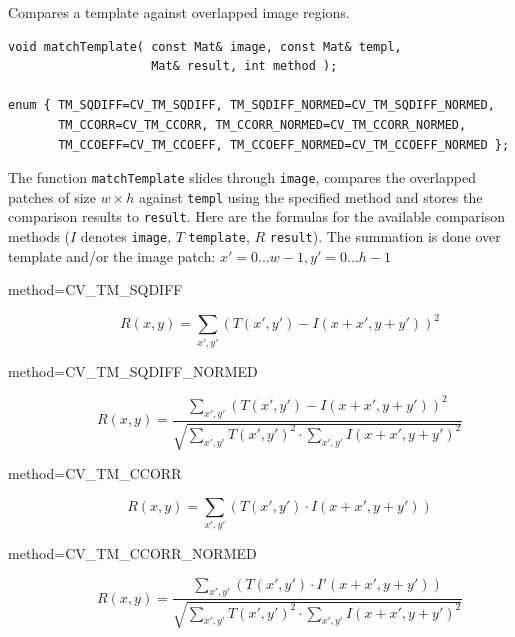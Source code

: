 \begin{description}
\label{matchTemplate}
Compares a template against overlapped image regions.

\begin{lstlisting}
void matchTemplate( const Mat& image, const Mat& templ,
                    Mat& result, int method );

enum { TM_SQDIFF=CV_TM_SQDIFF, TM_SQDIFF_NORMED=CV_TM_SQDIFF_NORMED,
       TM_CCORR=CV_TM_CCORR, TM_CCORR_NORMED=CV_TM_CCORR_NORMED,
       TM_CCOEFF=CV_TM_CCOEFF, TM_CCOEFF_NORMED=CV_TM_CCOEFF_NORMED };
\end{lstlisting}
\begin{description}
\end{description}

The function \texttt{matchTemplate} slides through \texttt{image}, compares the
overlapped patches of size $w \times h$ against \texttt{templ}
using the specified method and stores the comparison results to
\texttt{result}. Here are the formulas for the available comparison
methods ($I$ denotes \texttt{image}, $T$ \texttt{template},
$R$ \texttt{result}). The summation is done over template and/or the
image patch: $x' = 0...w-1, y' = 0...h-1$


\begin{description}
\item[method=CV\_TM\_SQDIFF]
\[ R(x,y)=\sum_{x',y'} (T(x',y')-I(x+x',y+y'))^2 \]

\item[method=CV\_TM\_SQDIFF\_NORMED]
\[ R(x,y)=\frac
{\sum_{x',y'} (T(x',y')-I(x+x',y+y'))^2}
{\sqrt{\sum_{x',y'}T(x',y')^2 \cdot \sum_{x',y'} I(x+x',y+y')^2}}
\]

\item[method=CV\_TM\_CCORR]
\[ R(x,y)=\sum_{x',y'} (T(x',y') \cdot I(x+x',y+y')) \]

\item[method=CV\_TM\_CCORR\_NORMED]
\[ R(x,y)=\frac
{\sum_{x',y'} (T(x',y') \cdot I'(x+x',y+y'))}
{\sqrt{\sum_{x',y'}T(x',y')^2 \cdot \sum_{x',y'} I(x+x',y+y')^2}}
\]


\end{description}
\end{description}

